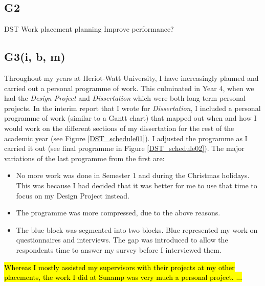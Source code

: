 \subsection*{G2}

DST
Work placement planning
Improve performance?


\subsection*{G3(i, b, m)}


Throughout my years at Heriot-Watt University, I have increasingly planned and carried out a personal programme of work.
This culminated in Year 4, when we had the \textit{Design Project} and \textit{Dissertation} which were both long-term personal projects.
In the interim report that I wrote for \textit{Dissertation}, I included a personal programme of work (similar to a Gantt chart) that mapped out when and how I would work on the different sections of my dissertation for the rest of the academic year (see Figure \ref{DST_schedule01}).
I adjusted the programme as I carried it out (see final programme in Figure \ref{DST_schedule02}).
The major variations of the last programme from the first are:
\begin{itemize}
    \item No more work was done in Semester 1 and during the Christmas holidays. This was because I had decided that it was better for me to use that time to focus on my Design Project instead.
    \item The programme was more compressed, due to the above reasons.
    \item The blue block was segmented into two blocks. Blue represented my work on questionnaires and interviews. The gap was introduced to allow the respondents time to answer my survey before I interviewed them.
\end{itemize}

\hl{Whereas I mostly assisted my supervisors with their projects at my other placements, the work I did at Sunamp was very much a personal project.
...}


